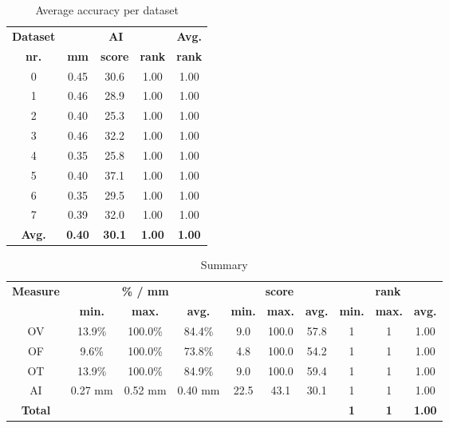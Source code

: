 \begin{table*}
\scriptsize
\caption{Average accuracy per dataset}
\centering
\begin{tabular}{|c|ccc|c|}
\hline
\multicolumn{1}{|c|}{\textbf{Dataset}} &\multicolumn{3}{c|}{\textbf{AI}} &\multicolumn{1}{c|}{\textbf{Avg.}} \\
\multicolumn{1}{|c|}{\textbf{nr.}} &\multicolumn{1}{c|}{\textbf{mm}} &\multicolumn{1}{c|}{\textbf{score}} &\multicolumn{1}{c|}{\textbf{rank}} &\multicolumn{1}{c|}{\textbf{rank}}\\
\hline
0&0.45&30.6& 1.00& 1.00\\
1&0.46&28.9& 1.00& 1.00\\
2&0.40&25.3& 1.00& 1.00\\
3&0.46&32.2& 1.00& 1.00\\
4&0.35&25.8& 1.00& 1.00\\
5&0.40&37.1& 1.00& 1.00\\
6&0.35&29.5& 1.00& 1.00\\
7&0.39&32.0& 1.00& 1.00\\
\hline
\textbf{Avg.}&\textbf{0.40}&\textbf{30.1}&\textbf{ 1.00}&\textbf{ 1.00}\\
\hline
\end{tabular}
\vspace{-0.3cm}
\label{tb:tb_4_5}
\normalsize
\end{table*}

\begin{table*}
\scriptsize
\caption{Summary}
\centering
\begin{tabular}{|c|ccc|ccc|ccc|}
\hline
\multicolumn{1}{|c|}{\textbf{Measure}} &\multicolumn{3}{c|}{\textbf{\% / mm}} &\multicolumn{3}{c|}{\textbf{score}} &\multicolumn{3}{c|}{\textbf{rank}} \\
\multicolumn{1}{|c|}{\textbf{}} &\multicolumn{1}{c|}{\textbf{min.}} &\multicolumn{1}{c|}{\textbf{max.}} &\multicolumn{1}{c|}{\textbf{avg.}} &\multicolumn{1}{c|}{\textbf{min.}} &\multicolumn{1}{c|}{\textbf{max.}} &\multicolumn{1}{c|}{\textbf{avg.}} &\multicolumn{1}{c|}{\textbf{min.}} &\multicolumn{1}{c|}{\textbf{max.}} &\multicolumn{1}{c|}{\textbf{avg.}}\\
\hline
OV&13.9\%&100.0\%&84.4\%& 9.0&100.0&57.8&1&1& 1.00\\
OF& 9.6\%&100.0\%&73.8\%& 4.8&100.0&54.2&1&1& 1.00\\
OT&13.9\%&100.0\%&84.9\%& 9.0&100.0&59.4&1&1& 1.00\\
AI&0.27 mm&0.52 mm&0.40 mm&22.5&43.1&30.1&1&1& 1.00\\
\hline
\textbf{Total}&\textbf{}&\textbf{}&\textbf{}&\textbf{}&\textbf{}&\textbf{}&\textbf{1}&\textbf{1}&\textbf{ 1.00}\\
\hline
\end{tabular}
\vspace{-0.3cm}
\label{tb:tb_4_6}
\normalsize
\end{table*}

